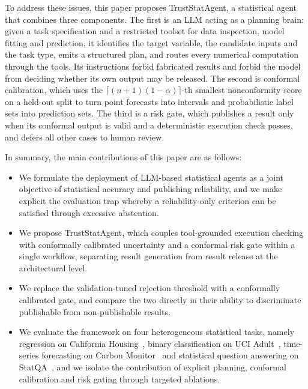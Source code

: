 \documentclass[preprint,12pt,authoryear]{elsarticle}
\begin{document}
To address these issues, this paper proposes TrustStatAgent, a statistical agent that combines three components. The first is an LLM acting as a planning brain: given a task specification and a restricted toolset for data inspection, model fitting and prediction, it identifies the target variable, the candidate inputs and the task type, emits a structured plan, and routes every numerical computation through the tools. Its instructions forbid fabricated results and forbid the model from deciding whether its own output may be released. The second is conformal calibration, which uses the $\lceil (n+1)(1-\alpha)\rceil$-th smallest nonconformity score on a held-out split to turn point forecasts into intervals and probabilistic label sets into prediction sets. The third is a risk gate, which publishes a result only when its conformal output is valid and a deterministic execution check passes, and defers all other cases to human review.

In summary, the main contributions of this paper are as follows:
\begin{itemize}
  \item We formulate the deployment of LLM-based statistical agents as a joint objective of statistical accuracy and publishing reliability, and we make explicit the evaluation trap whereby a reliability-only criterion can be satisfied through excessive abstention.
  \item We propose TrustStatAgent, which couples tool-grounded execution checking with conformally calibrated uncertainty and a conformal risk gate within a single workflow, separating result generation from result release at the architectural level.
  \item We replace the validation-tuned rejection threshold with a conformally calibrated gate, and compare the two directly in their ability to discriminate publishable from non-publishable results.
  \item We evaluate the framework on four heterogeneous statistical tasks, namely regression on California Housing~\citep{pace1997sparse}, binary classification on UCI Adult~\citep{becker1996adult}, time-series forecasting on Carbon Monitor~\citep{liu2020carbon} and statistical question answering on StatQA~\citep{zhu2024large}, and we isolate the contribution of explicit planning, conformal calibration and risk gating through targeted ablations.
\end{itemize}

\end{document}
